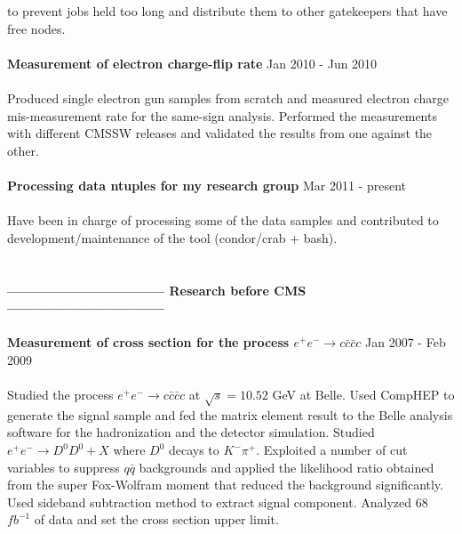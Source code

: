 \documentclass[margin]{res}
\begin{document}
\begin{resume}
     to prevent jobs held too long and distribute them to other gatekeepers that have 
     free nodes. 
     \\
     \\
\textbf{Measurement of electron charge-flip rate} 
      \hfill Jan 2010 - Jun 2010 
      \\ 
      \\ 
      Produced single electron gun samples from scratch and measured electron charge mis-measurement rate 
      for the same-sign analysis. Performed the measurements with different CMSSW releases 
      and validated the results from one against the other.
      \\
      \\
\textbf{Processing data ntuples for my research group} 
      \hfill Mar 2011  - present 
      \\ 
      \\
      Have been in charge of processing some of the data samples and contributed to development/maintenance 
      of the tool (condor/crab + bash). 
      \\
      \\
      \\
\textbf{--------------------------------- 
                Research before CMS 
        ---------------------------------}
     \\
     \\
\textbf{Measurement of cross section for the process $e^+e^- \rightarrow c\bar{c}\bar{c}c$} 
      \hfill Jan 2007 - Feb 2009 
      \\
      \\
      Studied the process $e^+e^- \rightarrow c\bar{c}\bar{c}c$ at $\sqrt{s} = 10.52$ GeV at Belle. 
      Used CompHEP to generate the signal sample and fed the matrix element result to the 
      Belle analysis software for the hadronization and the detector simulation. 
      Studied $e^+e^- \rightarrow D^0D^0+X$ where $D^0$ decays to $K^-\pi^+$.
      Exploited a number of cut variables to suppress $q\bar{q}$ backgrounds 
      and applied the likelihood ratio obtained from the super Fox-Wolfram moment 
      that reduced the background significantly. 
      Used sideband subtraction method to extract signal component. 
      Analyzed 68 $fb^{-1}$ of data and set the cross section upper limit.
      \\
      \\

\end{resume}
\end{document}
